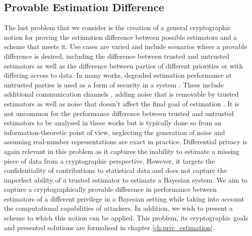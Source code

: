 % 
% 

\subsection{Provable Estimation Difference}\label{subsec:intro:provable_est_perf}
The last problem that we consider is the creation of a general cryptographic notion for proving the estimation difference between possible estimators and a scheme that meets it. Use cases are varied and include scenarios where a provable difference is desired, including the difference between trusted and untrusted estimators as well as the difference between parties of different priorities or with differing access to data. In many works, degraded estimation performance at untrusted parties is used as a form of security in a system \cite{specialePrivacyPreservingImageBased2019,liPrivacyPreservingDistributedOptimization2020,leongTransmissionSchedulingRemote2019,leongInformationBoundsState2019,grovesPrinciplesGNSSInertial2015}. These include additional communication channels \cite{leongInformationBoundsState2019,grovesPrinciplesGNSSInertial2015}, adding noise that is removable by trusted estimators \cite{murguiaInformationTheoreticPrivacyChaos2020,leongUseArtificialNoise2018} as well as noise that doesn't affect the final goal of estimation \cite{liPrivacyPreservingDistributedOptimization2020}. It is not uncommon for the performance difference between trusted and untrusted estimators to be analysed in these works \cite{hePreservingDataPrivacyAdded2018,murguiaInformationTheoreticPrivacyChaos2020,sinopoliKalmanFilteringIntermittent2004,mishraSecureStateEstimation2015} but is typically done so from an information-theoretic point of view, neglecting the generation of noise and assuming real-number representations are exact in practice. Differential privacy \cite{dworkDifferentialPrivacySurvey2008} is again relevant in this problem as it captures the inability to estimate a missing piece of data from a cryptographic perspective. However, it targets the confidentiality of contributions to statistical data and does not capture the imperfect ability of a trusted estimator to estimate a Bayesian system. We aim to capture a cryptographically provable difference in performance between estimators of a different privilege in a Bayesian setting while taking into account the computational capabilities of attackers. In addition, we wish to present a scheme to which this notion can be applied. This problem, its cryptographic goals and presented solutions are formalised in chapter \ref{ch:priv_estimation}.

